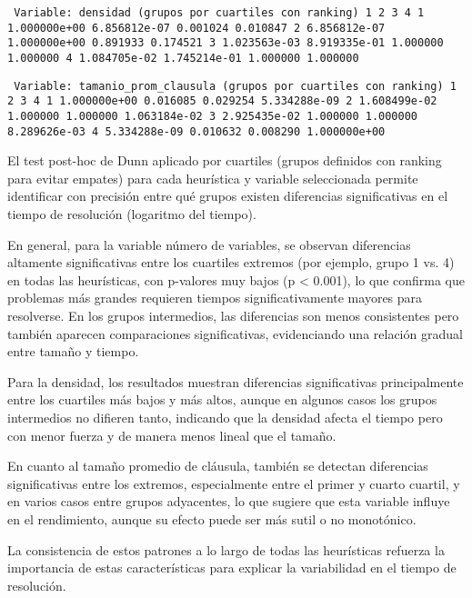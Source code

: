 \texttt{
Variable: densidad (grupos por cuartiles con ranking)
              1             2         3         4
1  1.000000e+00  6.856812e-07  0.001024  0.010847
2  6.856812e-07  1.000000e+00  0.891933  0.174521
3  1.023563e-03  8.919335e-01  1.000000  1.000000
4  1.084705e-02  1.745214e-01  1.000000  1.000000}

\texttt{
Variable: tamanio\_prom\_clausula (grupos por cuartiles con ranking)
              1         2         3             4
1  1.000000e+00  0.016085  0.029254  5.334288e-09
2  1.608499e-02  1.000000  1.000000  1.063184e-02
3  2.925435e-02  1.000000  1.000000  8.289626e-03
4  5.334288e-09  0.010632  0.008290  1.000000e+00}

El test post-hoc de Dunn aplicado por cuartiles (grupos definidos con ranking para evitar empates) para cada heurística y variable seleccionada permite identificar con precisión entre qué grupos existen diferencias significativas en el tiempo de resolución (logaritmo del tiempo).

En general, para la variable número de variables, se observan diferencias altamente significativas entre los cuartiles extremos (por ejemplo, grupo 1 vs. 4) en todas las heurísticas, con p-valores muy bajos (p < 0.001), lo que confirma que problemas más grandes requieren tiempos significativamente mayores para resolverse. En los grupos intermedios, las diferencias son menos consistentes pero también aparecen comparaciones significativas, evidenciando una relación gradual entre tamaño y tiempo. 

Para la densidad, los resultados muestran diferencias significativas principalmente entre los cuartiles más bajos y más altos, aunque en algunos casos los grupos intermedios no difieren tanto, indicando que la densidad afecta el tiempo pero con menor fuerza y de manera menos lineal que el tamaño.

En cuanto al tamaño promedio de cláusula, también se detectan diferencias significativas entre los extremos, especialmente entre el primer y cuarto cuartil, y en varios casos entre grupos adyacentes, lo que sugiere que esta variable influye en el rendimiento, aunque su efecto puede ser más sutil o no monotónico.

La consistencia de estos patrones a lo largo de todas las heurísticas refuerza la importancia de estas características para explicar la variabilidad en el tiempo de resolución.


